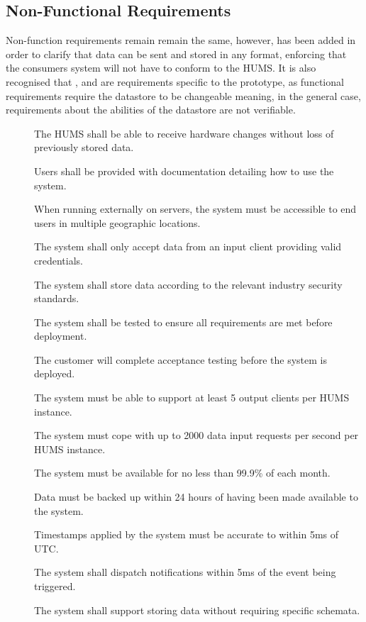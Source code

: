\subsection{Non-Functional Requirements}
Non-function requirements remain remain the same, however,  has been added in order to clarify that data can be sent and stored in any format, enforcing that the consumers system will not have to conform to the HUMS. It is also recognised that ,  and  are requirements specific to the prototype, as functional requirements require the datastore to be changeable meaning, in the general case, requirements about the abilities of the datastore are not verifiable.
\begin{description}
\item[] The HUMS shall be able to receive hardware changes without loss of previously stored data.
\item[]  Users shall be provided with documentation detailing how to use the system.
\item[] When running externally on servers, the system must be accessible to end users in multiple
geographic locations.
\item[]  The system shall only accept data from an input client providing valid credentials. 
\item[] The system shall store data according to the relevant industry security standards. 
\item[]  The system shall be tested to ensure all requirements are met before deployment.
\item[] The customer will complete acceptance testing before the system is deployed.
\item[] The system must be able to support at least 5 output clients per HUMS instance. 
\item[]  The system must cope with up to 2000 data input requests per second per HUMS instance. 
\item[] The system must be available for no less than 99.9\% of each month.
\item[]  Data must be backed up within 24 hours of having been made available to the system.
 \item[] Timestamps applied by the system must be accurate to within 5ms of UTC.
\item[]  The system shall dispatch notifications within 5ms of the event being triggered.
\item[] The system shall support storing data without requiring specific schemata.
\end{description}

